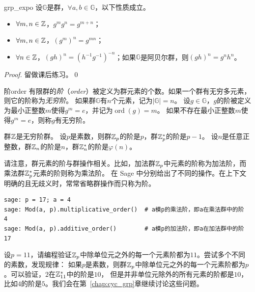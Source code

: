 \begin{proposition}{}{grp_expo}
设$\mathbb{G}$是群，$\forall a, b \in \mathbb{G}$，以下性质成立。
\begin{itemize}
\item $\forall m,n \in {\mathbb Z}$，$g^m g^n = g^{m+n}$；

\item $\forall m,n \in {\mathbb Z}$，$(g^m)^n = g^{mn}$；

\item $\forall n \in {\mathbb Z}$，$(gh)^n = (h^{-1}g^{-1})^{-n}$；如果$\mathbb{G}$是阿贝尔群，则$(gh)^n = g^n h^n$。
\end{itemize}
\end{proposition}
\begin{proof}
留做课后练习。\qed
\end{proof}

\begin{definition}{阶}{order}
       有限群的\emph{阶}（\emph{order}）被定义为群元素的个数。如果一个群有无穷多元素，则它的阶称为\emph{无穷阶}。
       如果群$\mathbb{G}$有$n$个元素，记为$\vert \mathbb{G} \vert = n$。
       设$g \in \mathbb{G}$，$g$的阶被定义为最小正整数$m$使得$g^m = e$，并记为$\operatorname{ord}(g) = m$。
       如果不存在最小正整数$m$使得$g^m = e$，则称$g$有无穷阶。
 \end{definition}
\begin{example}
群${\mathbb Z}$是无穷阶群。
设$p$是素数，则群${\mathbb Z}_p$的阶是$p$，群${\mathbb Z}_p^*$的阶是$p -1$。
设$n$是任意正整数，群${\mathbb Z}_n$的阶是$n$，群${\mathbb Z}_n^*$的阶是$\varphi(n)$。
\end{example}

\begin{example}
请注意，群元素的阶与群操作相关。比如，加法群${\mathbb Z}_p$中元素的阶称为加法阶，而乘法群${\mathbb Z}_p^*$元素的阶则称为乘法阶。
在 Sage 中分别给出了不同的操作。在上下文明确的且无歧义时，常常省略群操作而只称为阶。

\begin{lstlisting}
sage: p = 17; a = 4
sage: Mod(a, p).multiplicative_order()  # a模p的乘法阶，即a在乘法群中的阶
4
sage: Mod(a, p).additive_order()        # a模p的加法阶，即a在加法群中的阶
17
\end{lstlisting}

\end{example}
\begin{example}
\label{exm:cyc_gen}
设$p=11$，请编程验证${\mathbb Z}_p$中除单位元之外的每一个元素阶都为$11$。尝试多个不同的素数，发现规律：
如果$p$是素数，则群${\mathbb Z}_p$中除单位元之外的每一个元素阶都为$p$。可以验证，$2$在${\mathbb Z}_{11}^*$中的阶是$10$，
但是并非单位元除外的所有元素的阶都是$10$，比如$4$的阶是$5$。我们会在第~\ref{chap:cyc_grp}章继续讨论这些问题。
\end{example}

